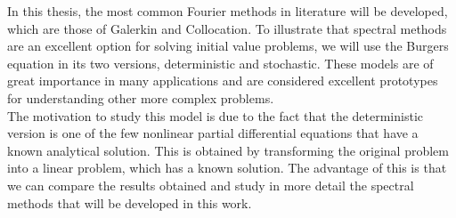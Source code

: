 	In this thesis, the most common Fourier methods in literature will be developed, which are those of Galerkin and Collocation. To illustrate that spectral methods are an excellent option for solving initial value problems, we will use the Burgers equation in its two versions, deterministic and stochastic. These models are of great importance in many applications and are considered excellent prototypes for understanding other more complex problems. \\ 
	
	The motivation to study this model is due to the fact that the deterministic version is one of the few nonlinear partial differential equations that have a known analytical solution. This is obtained by transforming the original problem into a linear problem, which has a known solution. The advantage of this is that we can compare the results obtained and study in more detail the spectral methods that will be developed in this work. \\
	
